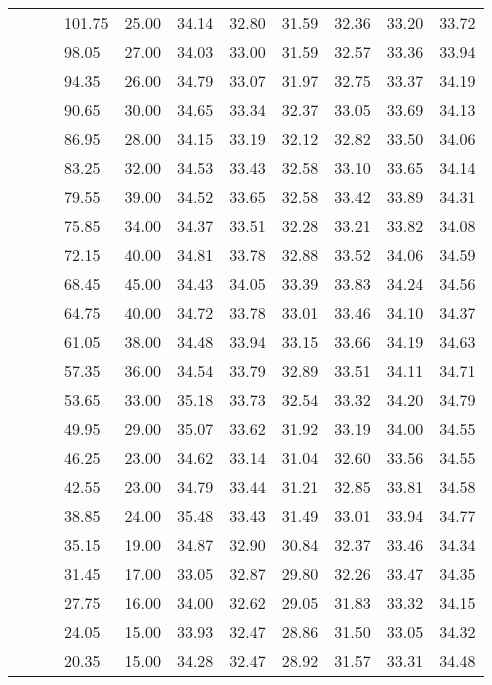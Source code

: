 \begin{longtable}{llllrrrrrrr}
   &  &  & 101.75 & 25.00 & 34.14 & 32.80 & 31.59 & 32.36 & 33.20 & 33.72 \\ 
   &  &  & 98.05 & 27.00 & 34.03 & 33.00 & 31.59 & 32.57 & 33.36 & 33.94 \\ 
   &  &  & 94.35 & 26.00 & 34.79 & 33.07 & 31.97 & 32.75 & 33.37 & 34.19 \\ 
   &  &  & 90.65 & 30.00 & 34.65 & 33.34 & 32.37 & 33.05 & 33.69 & 34.13 \\ 
   &  &  & 86.95 & 28.00 & 34.15 & 33.19 & 32.12 & 32.82 & 33.50 & 34.06 \\ 
   &  &  & 83.25 & 32.00 & 34.53 & 33.43 & 32.58 & 33.10 & 33.65 & 34.14 \\ 
   &  &  & 79.55 & 39.00 & 34.52 & 33.65 & 32.58 & 33.42 & 33.89 & 34.31 \\ 
   &  &  & 75.85 & 34.00 & 34.37 & 33.51 & 32.28 & 33.21 & 33.82 & 34.08 \\ 
   &  &  & 72.15 & 40.00 & 34.81 & 33.78 & 32.88 & 33.52 & 34.06 & 34.59 \\ 
   &  &  & 68.45 & 45.00 & 34.43 & 34.05 & 33.39 & 33.83 & 34.24 & 34.56 \\ 
   &  &  & 64.75 & 40.00 & 34.72 & 33.78 & 33.01 & 33.46 & 34.10 & 34.37 \\ 
   &  &  & 61.05 & 38.00 & 34.48 & 33.94 & 33.15 & 33.66 & 34.19 & 34.63 \\ 
   &  &  & 57.35 & 36.00 & 34.54 & 33.79 & 32.89 & 33.51 & 34.11 & 34.71 \\ 
   &  &  & 53.65 & 33.00 & 35.18 & 33.73 & 32.54 & 33.32 & 34.20 & 34.79 \\ 
   &  &  & 49.95 & 29.00 & 35.07 & 33.62 & 31.92 & 33.19 & 34.00 & 34.55 \\ 
   &  &  & 46.25 & 23.00 & 34.62 & 33.14 & 31.04 & 32.60 & 33.56 & 34.55 \\ 
   &  &  & 42.55 & 23.00 & 34.79 & 33.44 & 31.21 & 32.85 & 33.81 & 34.58 \\ 
   &  &  & 38.85 & 24.00 & 35.48 & 33.43 & 31.49 & 33.01 & 33.94 & 34.77 \\ 
   &  &  & 35.15 & 19.00 & 34.87 & 32.90 & 30.84 & 32.37 & 33.46 & 34.34 \\ 
   &  &  & 31.45 & 17.00 & 33.05 & 32.87 & 29.80 & 32.26 & 33.47 & 34.35 \\ 
   &  &  & 27.75 & 16.00 & 34.00 & 32.62 & 29.05 & 31.83 & 33.32 & 34.15 \\ 
   &  &  & 24.05 & 15.00 & 33.93 & 32.47 & 28.86 & 31.50 & 33.05 & 34.32 \\ 
   &  &  & 20.35 & 15.00 & 34.28 & 32.47 & 28.92 & 31.57 & 33.31 & 34.48 \\ 

\end{longtable}
